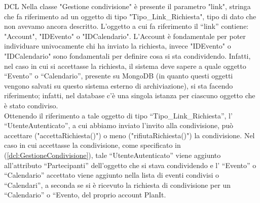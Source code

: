\begin{listaPersonale}{DCL}
    Nella classe "Gestione condivisione" è presente il parametro "link", stringa che fa riferimento ad un oggetto di tipo "Tipo\_Link\_Richiesta", tipo di dato che non avevamo ancora descritto.
    L'oggetto a cui fa riferimento il “link” contiene: "Account", "IDEvento" o "IDCalendario". L'Account è fondamentale per poter individuare univocamente chi ha inviato la richiesta, invece "IDEvento" o "IDCalendario" sono fondamentali per definire cosa si sta condividendo. Infatti, nel caso in cui si accettasse la richiesta, il sistema deve sapere a quale oggetto “Evento” o “Calendario”, presente su MongoDB (in quanto questi oggetti vengono salvati su questo sistema esterno di archiviazione), si sta facendo riferimento; infatti, nel database c'è una singola istanza per ciascuno oggetto che è stato condiviso.\\
    Ottenendo il riferimento a tale oggetto di tipo “Tipo\_Link\_Richiesta”, l' “UtenteAutenticato”, a cui abbiamo inviato l'invito alla condivisione, può accettare ("accettaRichiesta()") o meno ("rifiutaRichiesta()") la condivisione. Nel caso in cui accettasse la condivisione, come specificato in (\ref{dcl:GestioneCondivisione}), tale “UtenteAutenticato” viene aggiunto all'attributo “Partecipanti” dell'oggetto che si stava condividendo e l' “Evento” o “Calendario” accettato viene aggiunto nella lista di eventi condivisi o “Calendari”, a seconda se si è ricevuto la richiesta di condivisione per un “Calendario” o “Evento, del proprio account PlanIt.



\end{listaPersonale}
